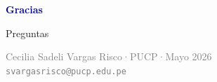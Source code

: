 \documentclass[aspectratio=169, 10pt]{beamer}
\begin{document}
\begin{frame}[plain]
  \vspace{0pt}
  \begin{center}
    \vspace{36pt}
    {\Huge\textbf{\textcolor{darkblue}{Gracias}}}

    \vspace{28pt}
    {\large\textcolor{midblue}{Preguntas}}

    \vfill
    \small\textcolor{gray}{
      Cecilia Sadeli Vargas Risco\quad·\quad PUCP\quad·\quad Mayo 2026\\[4pt]
      \texttt{svargasrisco@pucp.edu.pe}
    }
  \end{center}
\end{frame}

\end{document}
